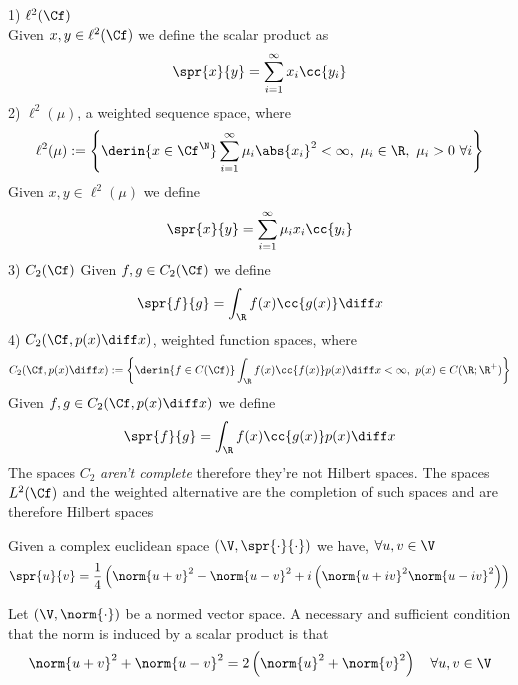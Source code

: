 \documentclass[../mmf.tex]{subfiles}
\begin{document}
\begin{eg}
	1) $\ell^2(\Cf)$\\
	Given $x,y\in\ell^2(\Cf)$ we define the scalar product as
	\begin{equation*}
		\spr{x}{y}=\sum_{i=1}^\infty x_i\cc{y_i}
	\end{equation*}
	2) $\ell^2(\mu)$, a weighted sequence space, where
	\begin{equation*}
		\ell^2(\mu):=\left\{ \derin{x\in\Cf^{\N}}\sum_{i=1}^\infty\mu_i\abs{x_i}^2<\infty,\ \mu_i\in\R,\ \mu_i>0\ \forall i \right\}
	\end{equation*}
	Given $x,y\in\ell^2(\mu)$ we define
	\begin{equation*}
		\spr{x}{y}=\sum_{i=1}^\infty\mu_ix_i\cc{y_i}
	\end{equation*}
	3) $C_2(\Cf)$
	Given $f,g\in C_2(\Cf)$ we define
	\begin{equation*}
		\spr{f}{g}=\int_{\R} f(x)\cc{g(x)}\diff x
	\end{equation*}
	4) $C_2(\Cf,p(x)\diff x)$, weighted function spaces, where
	\begin{equation*}
		C_2(\Cf,p(x)\diff x):=\left\{ \derin{f\in C(\Cf)}\int_{\R} f(x)\cc{f(x)}p(x)\diff x<\infty,\ p(x)\in C(\R;\R^+) \right\}
	\end{equation*}
	Given $f,g\in C_2(\Cf,p(x)\diff x)$ we define
	\begin{equation*}
		\spr{f}{g}=\int_{\R} f(x)\cc{g(x)}p(x)\diff x
	\end{equation*}
	The spaces $C_2$ \emph{aren't complete} therefore they're not Hilbert spaces. The spaces $L^2(\Cf)$ and the weighted alternative are the completion of such spaces and are therefore Hilbert spaces
\end{eg}
\begin{thm}
	Given a complex euclidean space $(\V,\spr{\cdot}{\cdot})$ we have, $\forall u,v\in\V$
	\begin{equation}
		\spr{u}{v}=\frac{1}{4}\left( \norm{u+v}^2-\norm{u-v}^2+i\left( \norm{u+iv}^2\norm{u-iv}^2 \right) \right)
		\label{eq:polarizationid}
	\end{equation}
\end{thm}
\begin{thm}
	Let $(\V,\norm{\cdot})$ be a normed vector space. A necessary and sufficient condition that the norm is induced by a scalar product is that
	\begin{equation}
		\norm{u+v}^2+\norm{u-v}^2=2\left( \norm{u}^2+\norm{v}^2 \right)\quad\forall u,v\in\V
		\label{eq:parallelogramrule}
	\end{equation}
\end{thm}
\end{document}

